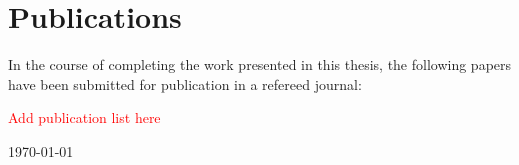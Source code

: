 \chapter*{Publications}

In the course of completing the work presented in this thesis, the following papers have been submitted for publication in a refereed journal:

\textcolor{red}{Add publication list here}

\vfill
{\sc \AuthorName \hfill\today}